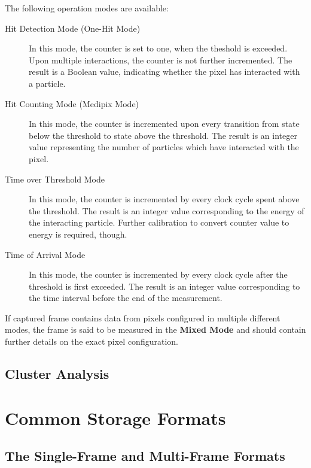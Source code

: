 The following operation modes are available:

\begin{description}
	\item[Hit Detection Mode (One-Hit Mode)]
	In this mode, the counter is set to one, when the theshold is exceeded. Upon multiple interactions, the counter is not further incremented. The result is a Boolean value, indicating whether the pixel has interacted with a particle.

	\item[Hit Counting Mode (Medipix Mode)]
	In this mode, the counter is incremented upon every transition from state below the threshold to state above the threshold. The result is an integer value representing the number of particles which have interacted with the pixel.

	\item[Time over Threshold Mode]
	In this mode, the counter is incremented by every clock cycle spent above the threshold. The result is an integer value corresponding to the energy of the interacting particle. Further calibration to convert counter value to energy is required, though.

	\item[Time of Arrival Mode]
	In this mode, the counter is incremented by every clock cycle after the threshold is first exceeded. The result is an integer value corresponding to the time interval before the end of the measurement.
\end{description}

If captured frame contains data from pixels configured in multiple different modes, the frame is said to be measured in the \textbf{Mixed Mode} and should contain further details on the exact pixel configuration.

\subsection{Cluster Analysis}


\section{Common Storage Formats}

\subsection{The Single-Frame and Multi-Frame Formats}

